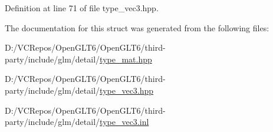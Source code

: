 Definition at line 71 of file type\+\_\+vec3.\+hpp.



The documentation for this struct was generated from the following files\+:\begin{DoxyCompactItemize}
\item 
D\+:/\+V\+C\+Repos/\+Open\+G\+L\+T6/\+Open\+G\+L\+T6/third-\/party/include/glm/detail/\mbox{\hyperlink{type__mat_8hpp}{type\+\_\+mat.\+hpp}}\item 
D\+:/\+V\+C\+Repos/\+Open\+G\+L\+T6/\+Open\+G\+L\+T6/third-\/party/include/glm/detail/\mbox{\hyperlink{type__vec3_8hpp}{type\+\_\+vec3.\+hpp}}\item 
D\+:/\+V\+C\+Repos/\+Open\+G\+L\+T6/\+Open\+G\+L\+T6/third-\/party/include/glm/detail/\mbox{\hyperlink{type__vec3_8inl}{type\+\_\+vec3.\+inl}}\end{DoxyCompactItemize}
